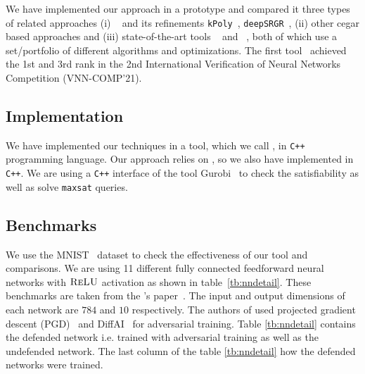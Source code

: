 We have implemented our approach in a prototype and compared it three types of related approaches (i) \deeppoly{}~\cite{singh2019abstract} and its refinements \texttt{kPoly}~\cite{singh2019beyond}, \texttt{deepSRGR}~\cite{yang2021improving}, (ii) other cegar based approaches and 
(iii) state-of-the-art tools \alphabeta~\cite{alphabetacrown} and \ovaltool~\cite{ovaltool}, both of which use a set/portfolio of different algorithms and optimizations. The first tool~\alphabeta{} achieved the 1st and \ovaltool{} 3rd rank in the 2nd International Verification of Neural Networks Competition (VNN-COMP'21).
\subsection{Implementation}
We have implemented our techniques in a tool, which we call \drefine{}, in \texttt{C++} programming language. Our approach relies on \deeppoly{}, so we also have implemented \deeppoly{} in \texttt{C++}. We are using a \texttt{C++} interface of the tool Gurobi~\cite{?}  to check the satisfiability as well as solve  \texttt{maxsat} queries. %

\subsection{Benchmarks}
We use the MNIST~\cite{deng2012mnist} dataset to check the effectiveness of our tool and comparisons. We are using 11 different fully connected feedforward neural networks with $\textsc{ReLU}${} activation as shown in table~\ref{tb:nndetail}.
These benchmarks are taken from the \deeppoly{}'s paper~\cite{singh2019abstract}.  The input and output dimensions of each network are $784$ and $10$ respectively. 
The authors of \deeppoly{} used projected gradient descent (PGD)~\cite{dong2018boosting}
and DiffAI~\cite{mirman2018differentiable} for adversarial training. Table \ref{tb:nndetail} contains the defended network i.e.
trained with adversarial training as well as the undefended network. The last column of the table \ref{tb:nndetail} how the defended networks were trained.  

